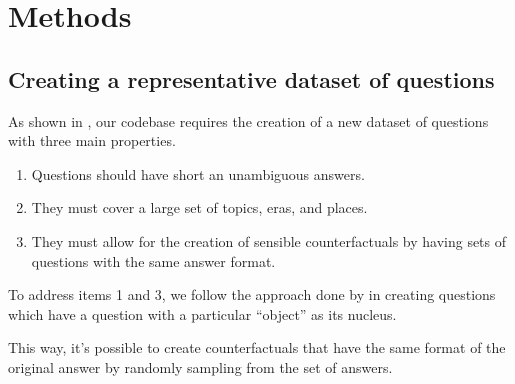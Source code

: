 \section{Methods}

\subsection{Creating a representative dataset of questions}

As shown in , our codebase requires the creation of a new dataset of questions with three main properties.

\begin{enumerate}
	\item Questions should have short an unambiguous answers. \label{q_short}
	\item They must cover a large set of topics, eras, and places. \label{q_widespread}
	\item They must allow for the creation of sensible counterfactuals by having sets of questions with the same answer format. \label{q_counterfactual}
\end{enumerate}

To address items 1 and 3, we follow the approach done by \citeauthor{factual_recall} in creating questions which have a question with a particular ``object'' as its nucleus.

This way, it's possible to create counterfactuals that have the same format of the original answer by randomly sampling from the set of answers.

% 

